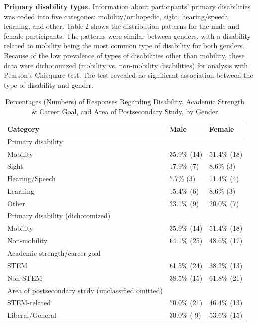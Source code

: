 \documentclass[11.5pt]{sig-alternate} %
\begin{document}
\begin{large}
\textbf{Primary disability type}s. Information about participants’ primary disabilities was coded into five categories: mobility/orthopedic, sight, hearing/speech, learning, and other. Table 2 shows the distribution patterns for the male and female participants. The patterns were similar between genders, with a disability related to mobility being the most common type of disability for both genders. Because of the low prevalence of types of disabilities other than mobility, these data were dichotomized (mobility vs. non-mobility disabilities) for analysis with Pearson’s Chisquare test. The test revealed no significant association between the type of disability and gender.  

\begin{table}[ht]
\caption{Percentages (Numbers) of Responses Regarding Disability, Academic Strength \& Career Goal, and Area of Postsecondary Study, by Gender}
\begin{tabular}{lll}
\hline
Category & Male & Female \\ \hline
Primary disability & & \\   
\hspace{2em} Mobility & 35.9\% (14) & 51.4\% (18) \\
\hspace{2em} Sight & 17.9\% (7) & 8.6\% (3) \\
\hspace{2em} Hearing/Speech & 7.7\% (3) & 11.4\% (4) \\
\hspace{2em} Learning & 15.4\% (6) & 8.6\% (3) \\
\hspace{2em} Other & 23.1\% (9) & 20.0\% (7) \\
Primary disability (dichotomized) & & \\
\hspace{2em} Mobility & 35.9\% (14) & 51.4\% (18) \\
\hspace{2em} Non-mobility & 64.1\% (25) & 48.6\% (17) \\
Academic strength/career goal & & \\
\hspace{2em} STEM & 61.5\% (24) & 38.2\% (13) \\
\hspace{2em} Non-STEM & 38.5\% (15) & 61.8\% (21) \\
Area of postsecondary study (unclassified omitted) & & \\
\hspace{2em} STEM-related & 70.0\% (21) & 46.4\% (13) \\
\hspace{2em} Liberal/General & 30.0\% ( 9) & 53.6\% (15) \\ \hline
\end{tabular}
\end{table}
 

\end{large}
\end{document}
